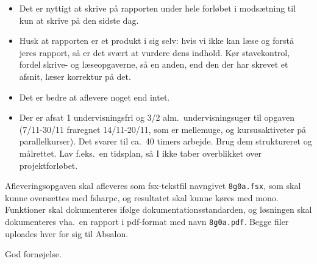 \documentclass[a4paper,12pt]{article}
\begin{document}
\begin{enumerate}[label=8g.\arabic*,start=0]
\begin{itemize}
  \item Det er nyttigt at skrive på rapporten under hele forløbet i modsætning til kun at skrive på den sidste dag.
  \item Husk at rapporten er et produkt i sig selv: hvis vi ikke kan læse og forstå jeres rapport, så er det svært at vurdere dens indhold. Kør stavekontrol, fordel skrive- og læseopgaverne, så en anden, end den der har skrevet et afsnit, læser korrektur på det.
  \item Det er bedre at aflevere noget end intet.
  \item Der er afsat 1 undervisningsfri og 3/2 alm.\ undervisningsuger til opgaven (7/11-30/11 fraregnet 14/11-20/11, som er mellemuge, og kursusaktiveter på parallelkurser). Det svarer til ca.\ 40 timers arbejde. Brug dem struktureret og målrettet. Lav f.eks.\ en tidsplan, så I ikke taber overblikket over projektforløbet.
  \end{itemize}
\end{enumerate}
Afleveringsopgaven skal afleveres som fsx-tekstfil navngivet \lstinline!8g0a.fsx!, som skal kunne oversættes med fsharpc, og resultatet skal kunne køres med mono. Funktioner skal dokumenteres ifølge dokumentationsstandarden, og løsningen skal dokumenteres vha.\ en rapport i pdf-format med navn \lstinline!8g0a.pdf!. Begge filer uploades hver for sig til Absalon.

\flushright God fornøjelse.
\end{document}

